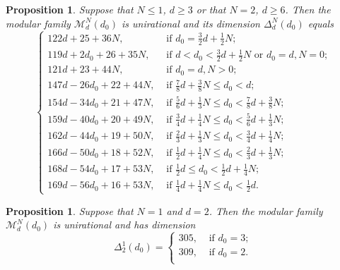 \documentclass[a4paper,11pt]{amsart}
\newcommand{\M}{\ensuremath{\mathcal{M}}}
\newtheorem{prop}[thm]{Proposition}
\theoremstyle{definition}
\theoremstyle{remark}
\numberwithin{equation}{section}
\begin{document}
\begin{prop} \label{prop: dimension moduli} 
	Suppose that $N \le 1$, $d \ge 3$ or that $N = 2$, $d \ge 6$. Then the modular family $\M^N_d(d_0)$ is unirational and its dimension $\Delta^N_d(d_0)$ equals
    $$
    \begin{cases}
        122d + 25 + 36N, & \text{ if } d_0 = \frac32d + \frac12N;\\ 
		119d + 2d_0 + 26 + 35N, & \text{ if } d < d_0 < \frac32d + \frac12N \text{ or } d_0=d, N=0;\\ 
		121d + 23 + 44N, & \text{ if } d_0 = d, N>0; \\
		147d - 26d_0 + 22 + 44N, & \text{ if } \frac78d + \frac38 N \le d_0 < d;\\ 
		154d - 34d_0 + 21 + 47N, & \text{ if } \frac56d + \frac13 N \le d_0 < \frac78d + \frac38 N;\\ 
		159d - 40d_0 + 20 + 49N, & \text{ if } \frac34d + \frac14 N \le d_0 < \frac56d + \frac13 N;\\ 
		162d - 44d_0 + 19 + 50N, & \text{ if } \frac23d + \frac13 N \le d_0 < \frac34d + \frac14 N;\\ 
		166d - 50d_0 + 18 + 52N, & \text{ if } \frac12d + \frac14 N \le d_0 < \frac23d + \frac13 N;\\ 
		168d - 54d_0 + 17 + 53N, & \text{ if } \frac12d \le d_0 < \frac12d + \frac14 N;\\
		169d - 56d_0 + 16 + 53N, & \text{ if } \frac14d + \frac14 N \le d_0 < \frac12d. 
    \end{cases}
    $$
\end{prop}

\begin{prop} \label{prop: dimension moduli N=1 d=2} 
	Suppose that $N = 1$ and $d = 2$. Then the modular family $\M^N_d(d_0)$ is unirational and has dimension	
    \[
	\Delta^1_2(d_0) = 
	\begin{cases}
		305, & \text{ if } d_0 = 3;\\
		309, & \text{ if } d_0=2.\\ 
	\end{cases}
	\]
\end{prop}
\end{document}
